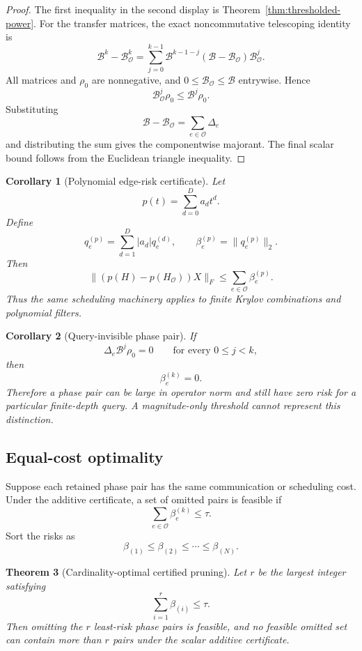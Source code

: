 \documentclass[11pt]{article}
\newtheorem{theorem}{Theorem}[section]
\newtheorem{corollary}[theorem]{Corollary}
\theoremstyle{definition}
\theoremstyle{remark}
\begin{document}
\begin{proof}
The first inequality in the second display is
Theorem~\ref{thm:thresholded-power}.  For the transfer matrices, the exact
noncommutative telescoping identity is
\[
\mathcal B^k-\mathcal B_{\mathcal O}^k
=
\sum_{j=0}^{k-1}
\mathcal B^{k-1-j}
(\mathcal B-\mathcal B_{\mathcal O})
\mathcal B_{\mathcal O}^j.
\]
All matrices and $\rho_0$ are nonnegative, and
$0\le\mathcal B_{\mathcal O}\le\mathcal B$ entrywise.  Hence
\[
\mathcal B_{\mathcal O}^j\rho_0
\le
\mathcal B^j\rho_0.
\]
Substituting
\[
\mathcal B-\mathcal B_{\mathcal O}
=
\sum_{e\in\mathcal O}\Delta_e
\]
and distributing the sum gives the componentwise majorant.  The final scalar
bound follows from the Euclidean triangle inequality.
\end{proof}

\begin{corollary}[Polynomial edge-risk certificate]
Let
\[
p(t)=\sum_{d=0}^{D}a_dt^d.
\]
Define
\[
q_e^{(p)}
=
\sum_{d=1}^{D}|a_d|q_e^{(d)},
\qquad
\beta_e^{(p)}=\lVert q_e^{(p)}\rVert_2.
\]
Then
\[
\boxed{
\lVert(p(H)-p(H_{\mathcal O}))X\rVert_F
\le
\sum_{e\in\mathcal O}\beta_e^{(p)}.
}
\]
Thus the same scheduling machinery applies to finite Krylov combinations and
polynomial filters.
\end{corollary}

\begin{corollary}[Query-invisible phase pair]
If
\[
\Delta_e\mathcal B^j\rho_0=0
\qquad
\text{for every }0\le j<k,
\]
then
\[
\beta_e^{(k)}=0.
\]
Therefore a phase pair can be large in operator norm and still have zero
risk for a particular finite-depth query.  A magnitude-only threshold cannot
represent this distinction.
\end{corollary}

\subsection{Equal-cost optimality}

Suppose each retained phase pair has the same communication or scheduling
cost.  Under the additive certificate, a set of omitted pairs is feasible if
\[
\sum_{e\in\mathcal O}\beta_e^{(k)}\le\tau.
\]
Sort the risks as
\[
\beta_{(1)}\le\beta_{(2)}\le\cdots\le\beta_{(N)}.
\]

\begin{theorem}[Cardinality-optimal certified pruning]
\label{thm:unit-cost-optimal}
Let $r$ be the largest integer satisfying
\[
\sum_{i=1}^{r}\beta_{(i)}\le\tau.
\]
Then omitting the $r$ least-risk phase pairs is feasible, and no feasible
omitted set can contain more than $r$ pairs under the scalar additive
certificate.
\end{theorem}
\end{document}
